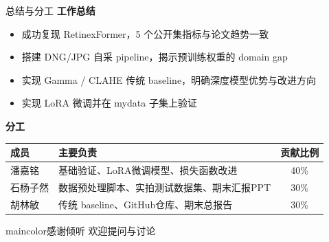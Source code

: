 \documentclass{beamer}
\begin{document}
\begin{frame}{总结与分工}
  \small
  \textbf{工作总结}
  \begin{itemize}
    \item 成功复现 RetinexFormer，5 个公开集指标与论文趋势一致
    \item 搭建 DNG/JPG 自采 pipeline，揭示预训练权重的 domain gap
    \item 实现 Gamma / CLAHE 传统 baseline，明确深度模型优势与改进方向
    \item 实现 LoRA 微调并在 mydata 子集上验证
  \end{itemize}

  \vspace{0.5em}
  \textbf{分工}
  \begin{tabular}{llc}
    \toprule
    成员 & 主要负责 & 贡献比例 \\
    \midrule
    潘嘉铭 & 基础验证、LoRA微调模型、损失函数改进 & 40\% \\
    石杨子然 & 数据预处理脚本、实拍测试数据集、期末汇报PPT & 30\% \\
    胡林敏 & 传统 baseline、GitHub仓库、期末总报告 & 30\% \\
    \bottomrule
  \end{tabular}
\end{frame}

\begin{chapter}{maincolor}{感谢倾听}
  \centering
  \vspace{1em}
  {\Large 欢迎提问与讨论}
\end{chapter}
\end{document}
